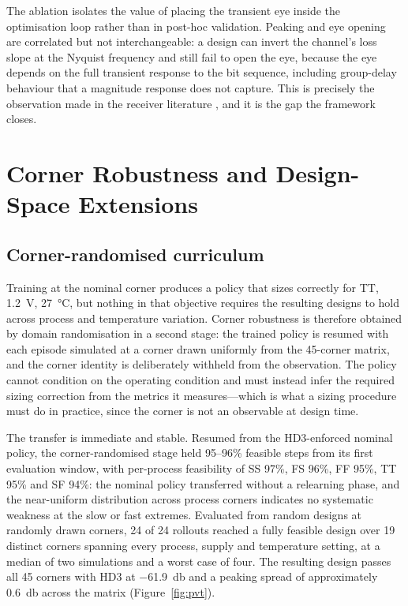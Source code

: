 \documentclass[10pt,a4paper]{article}
\begin{document}
The ablation isolates the value of placing the transient eye inside the
optimisation loop rather than in post-hoc validation. Peaking and eye opening are
correlated but not interchangeable: a design can invert the channel's loss slope
at the Nyquist frequency and still fail to open the eye, because the eye depends
on the full transient response to the bit sequence, including group-delay
behaviour that a magnitude response does not capture. This is precisely the
observation made in the receiver literature \cite{naidu2022,saif2021}, and it is
the gap the framework closes.

\section{Corner Robustness and Design-Space Extensions}
\label{sec:curriculum}

\subsection{Corner-randomised curriculum}

Training at the nominal corner produces a policy that sizes correctly for TT,
\SI{1.2}{\volt}, \SI{27}{\celsius}, but nothing in that objective requires the
resulting designs to hold across process and temperature variation. Corner
robustness is therefore obtained by domain randomisation in a second stage: the
trained policy is resumed with each episode simulated at a corner drawn uniformly
from the 45-corner matrix, and the corner identity is deliberately withheld from
the observation. The policy cannot condition on the operating condition and must
instead infer the required sizing correction from the metrics it measures---which
is what a sizing procedure must do in practice, since the corner is not an
observable at design time.

The transfer is immediate and stable. Resumed from the HD3-enforced nominal
policy, the corner-randomised stage held 95--96\% feasible steps from its first
evaluation window, with per-process feasibility of SS 97\%, FS 96\%, FF 95\%,
TT 95\% and SF 94\%: the nominal policy transferred without a relearning phase,
and the near-uniform distribution across process corners indicates no systematic
weakness at the slow or fast extremes. Evaluated from random designs at randomly
drawn corners, 24 of 24 rollouts reached a fully feasible design over 19 distinct
corners spanning every process, supply and temperature setting, at a median of
two simulations and a worst case of four. The resulting design passes all 45
corners with HD3 at \SI{-61.9}{\decibel} and a peaking spread of approximately
\SI{0.6}{\decibel} across the matrix (Figure~\ref{fig:pvt}).
\end{document}
